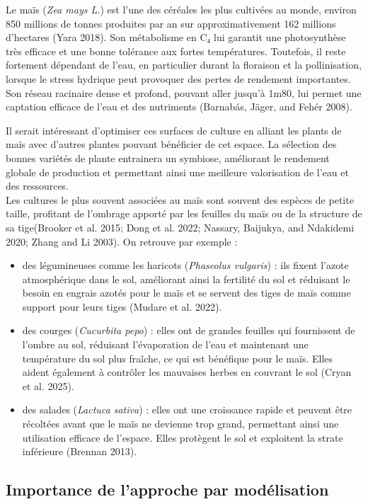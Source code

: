 \documentclass[
]{article}
\begin{document}
Le maïs (\emph{Zea mays L.}) est l'une des céréales les plus cultivées
au monde, environ 850 millions de tonnes produites par an sur
approximativement 162 millions d'hectares (Yara 2018). Son métabolisme
en C₄ lui garantit une photosynthèse très efficace et une bonne
tolérance aux fortes températures. Toutefois, il reste fortement
dépendant de l'eau, en particulier durant la floraison et la
pollinisation, lorsque le stress hydrique peut provoquer des pertes de
rendement importantes. Son réseau racinaire dense et profond, pouvant
aller jusqu'à 1m80, lui permet une captation efficace de l'eau et des
nutriments (Barnabás, Jäger, and Fehér 2008).

Il serait intéressant d'optimiser ces surfaces de culture en alliant les
plants de maïs avec d'autres plantes pouvant bénéficier de cet espace.
La sélection des bonnes variétés de plante entrainera un symbiose,
améliorant le rendement globale de production et permettant ainsi une
meilleure valorisation de l'eau et des ressources.\\
Les cultures le plus souvent associées au maïs sont souvent des espèces
de petite taille, profitant de l'ombrage apporté par les feuilles du
maïs ou de la structure de sa tige(Brooker et al. 2015; Dong et al.
2022; Nassary, Baijukya, and Ndakidemi 2020; Zhang and Li 2003). On
retrouve par exemple :

\begin{itemize}
\item
  des légumineuses comme les haricots (\emph{Phaseolus vulgaris}) : ils
  fixent l'azote atmosphérique dans le sol, améliorant ainsi la
  fertilité du sol et réduisant le besoin en engrais azotés pour le maïs
  et se servent des tiges de maïs comme support pour leurs tiges (Mudare
  et al. 2022).
\item
  des courges (\emph{Cucurbita pepo}) : elles ont de grandes feuilles
  qui fournissent de l'ombre au sol, réduisant l'évaporation de l'eau et
  maintenant une température du sol plus fraîche, ce qui est bénéfique
  pour le maïs. Elles aident également à contrôler les mauvaises herbes
  en couvrant le sol (Cryan et al. 2025).
\item
  des salades (\emph{Lactuca sativa}) : elles ont une croissance rapide
  et peuvent être récoltées avant que le maïs ne devienne trop grand,
  permettant ainsi une utilisation efficace de l'espace. Elles protègent
  le sol et exploitent la strate inférieure (Brennan 2013).
\end{itemize}

\subsection{Importance de l'approche par
modélisation}\label{importance-de-lapproche-par-moduxe9lisation}
\end{document}

